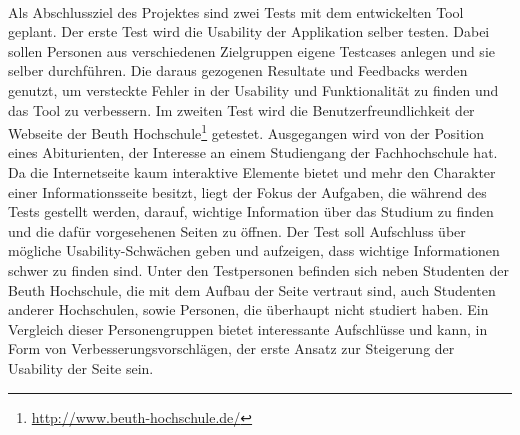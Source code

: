 \\
Als Abschlussziel des Projektes sind zwei Tests mit dem entwickelten Tool geplant. Der erste Test wird die Usability der Applikation selber testen. Dabei sollen Personen aus verschiedenen Zielgruppen eigene Testcases anlegen und sie selber durchführen. Die daraus gezogenen Resultate und Feedbacks werden genutzt, um versteckte Fehler in der Usability und Funktionalität zu finden und das Tool zu verbessern. Im zweiten Test wird die Benutzerfreundlichkeit der Webseite der Beuth Hochschule\footnote{\url{http://www.beuth-hochschule.de/}} getestet. Ausgegangen wird von der Position eines Abiturienten, der Interesse an einem Studiengang der Fachhochschule hat. Da die Internetseite kaum interaktive Elemente bietet und mehr den Charakter einer Informationsseite besitzt, liegt der Fokus der Aufgaben, die während des Tests gestellt werden, darauf, wichtige Information über das Studium zu finden und die dafür vorgesehenen Seiten zu öffnen. Der Test soll Aufschluss über mögliche Usability-Schwächen geben und aufzeigen, dass wichtige Informationen schwer zu finden sind. Unter den Testpersonen befinden sich neben Studenten der Beuth Hochschule, die mit dem Aufbau der Seite vertraut sind, auch Studenten anderer Hochschulen, sowie Personen, die überhaupt nicht studiert haben. Ein Vergleich dieser Personengruppen bietet interessante Aufschlüsse und kann, in Form von Verbesserungsvorschlägen, der erste Ansatz zur Steigerung der Usability der Seite sein.